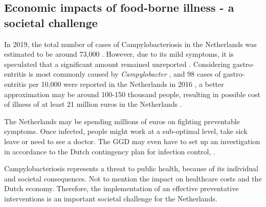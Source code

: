 \subsection*{Economic impacts of food-borne illness - a societal challenge}

In 2019, the total number of cases of Campylobacteriosis in the Netherlands was estimated to be around 73,000 \parencite{lagerweij_disease_2020}. However, due to its mild symptoms, it is speculated that a significant amount remained unreported \parencite{koutsoumanis_update_2020}. Considering gastro-entritis is most commonly caused by \textit{Campylobacter} \parencite{fouts_major_2005}, and 98 cases of gastro-entritis per 10,000 were reported in the Netherlands in 2016 \parencite{van_pelt_jaarraport_2016}, a better approximation may be around 100-150 thousand people, resulting in possible cost of illness of at least 21 million euros in the Netherlands \parencite{havelaar_costs_2005}.

The Netherlands may be spending millions of euros on fighting preventable symptoms. Once infected, people might work at a sub-optimal level, take sick leave or need to see a doctor. The GGD may even have to set up an investigation in accordance to the Dutch contingency plan for infection control, . 

Campylobacteriosis represents a threat to public health, because of its individual and societal consequences. Not to mention the impact on healthcare costs and the Dutch economy. Therefore, the implementation of an effective preventative interventions is an important societal challenge for the Netherlands.



